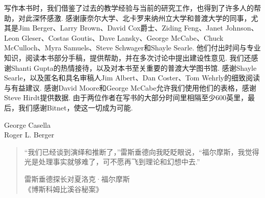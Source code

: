 写作本书时，我们借鉴了过去的教学经验与当前的研究工作，也得到了许多人的帮助，对此深怀感激. 感谢康奈尔大学、北卡罗来纳州立大学和普渡大学的同事，尤其是Jim Berger、Larry Brown、David Cox爵士、Ziding Feng、Janet Johnson、Leon Gleser、Costas Goutis、Dave Lansky、George McCabe、Chuck McCulloch、Myra Samuels、Steve Schwager和Shayle Searle. 他们付出时间与专业知识，阅读本书部分手稿，提供帮助，并在多次讨论中提出建设性意见. 我们还感谢Shanti Gupta的热情接待，以及对本书至关重要的普渡大学图书馆. 感谢Shayle Searle，以及匿名和具名审稿人Jim Albert、Dan Coster、Tom Wehrly的细致阅读与有益建议. 感谢David Moore和George McCabe允许我们使用他们的表格，感谢Steve Hirdt提供数据. 由于两位作者在写书的大部分时间里相隔至少600英里，最后，我们感谢Bitnet，使这一切成为可能.
\begin{flushright}George Casella\\Roger L. Berger\end{flushright}
\clearpage
\begin{quote}
“我们已经谈到演绎和推断了，”雷斯垂德向我眨眨眼说，“福尔摩斯，我觉得光是处理事实就够难了，可不愿再飞到理论和幻想中去.”
\begin{flushright}雷斯垂德探长对夏洛克·福尔摩斯\\《博斯科姆比溪谷秘案》\end{flushright}
\end{quote}
